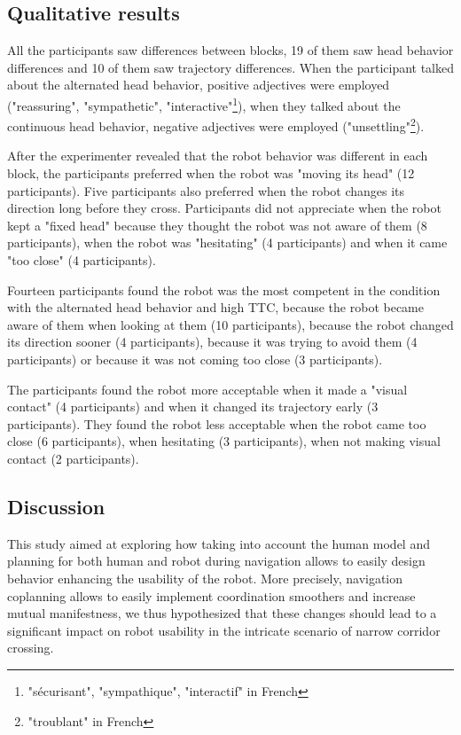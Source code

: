 \documentclass[a4paper,11pt,twoside]{StyleThese}
\begin{document}
\subsection{Qualitative results}
All the participants saw differences between blocks, 19 of them saw head behavior differences and 10 of them saw trajectory differences. When the participant talked about the alternated head behavior, positive adjectives were employed ("reassuring", "sympathetic", "interactive"\footnote{"sécurisant", "sympathique", "interactif" in French}), when they talked about the continuous head behavior, negative adjectives were employed ("unsettling"\footnote{"troublant" in French}).

After the experimenter revealed that the robot behavior was different in each block, the participants preferred when the robot was "moving its head" (12 participants). Five participants also preferred when the robot changes its direction long before they cross. Participants did not appreciate when the robot kept a "fixed head" because they thought the robot was not aware of them (8 participants), when the robot was "hesitating" (4 participants) and when it came "too close" (4 participants).

Fourteen participants found the robot was the most competent in the condition with the alternated head behavior and high TTC, because the robot became aware of them when looking at them (10 participants), because the robot changed its direction sooner (4 participants), because it was trying to avoid them (4 participants) or because it was not coming too close (3 participants).

The participants found the robot more acceptable when it made a "visual contact" (4 participants) and when it changed its trajectory early (3 participants). They found the robot less acceptable when the robot came too close (6 participants), when hesitating (3 participants), when not making visual contact (2 participants).


\subsection{Discussion}
This study aimed at exploring how taking into account the human model and planning for both human and robot during navigation allows to easily design behavior enhancing the usability of the robot. More precisely, navigation coplanning allows to easily implement coordination smoothers and increase mutual manifestness, we thus hypothesized that these changes should lead to a significant impact on robot usability in the intricate scenario of narrow corridor crossing.
\end{document}
